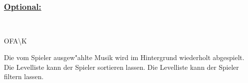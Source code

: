 ~\\


%
%
\subsubsection*{\underline{Optional:}}~\\


\begin{ids}{\gls{OFA\K}}

	\id[ 360] Die vom Spieler ausgew{"a}hlte Musik wird im Hintergrund wiederholt abgespielt.
	\id[ 370] Die Levelliste kann der Spieler sortieren lassen.
	\id[ 380] Die Levelliste kann der Spieler filtern lassen.
	
 	
 	
	
\end{ids}

~\\